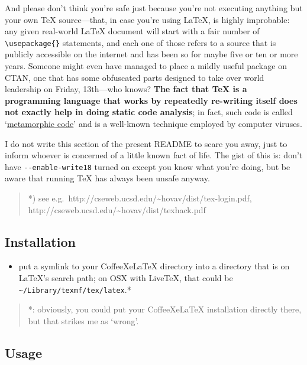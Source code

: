And please don't think you're safe just because you're not executing
anything but your own TeX source---that, in case you're using LaTeX, is
highly improbable: any given real-world LaTeX document will start with a
fair number of \texttt{\textbackslash{}usepackage\{\}} statements, and
each one of those refers to a source that is publicly accessible on the
internet and has been so for maybe five or ten or more years. Someone
might even have managed to place a mildly useful package on CTAN, one
that has some obfuscated parts designed to take over world leadership on
Friday, 13th---who knows? \textbf{The fact that TeX is a programming
language that works by repeatedly re-writing itself does not exactly
help in doing static code analysis}; in fact, such code is called
`\href{http://en.wikipedia.org/wiki/Metamorphic_code}{metamorphic code}'
and is a well-known technique employed by computer viruses.

I do not write this section of the present README to scare you away,
just to inform whoever is concerned of a little known fact of life. The
gist of this is: don't have \texttt{-{}-enable-write18} turned on except
you know what you're doing, but be aware that running TeX has always
been unsafe anyway.

\begin{quote}
*) see
e.g.~http://cseweb.ucsd.edu/\textasciitilde{}hovav/dist/tex-login.pdf,
http://cseweb.ucsd.edu/\textasciitilde{}hovav/dist/texhack.pdf
\end{quote}

\subsection{Installation}\label{installation}

\begin{itemize}
\itemsep1pt\parskip0pt
\item
  put a symlink to your CoffeeXeLaTeX directory into a directory that is
  on LaTeX's search path; on OSX with LiveTeX, that could be
  \texttt{\textasciitilde{}/Library/texmf/tex/latex}.*
\end{itemize}

\begin{quote}
*: obviously, you could put your CoffeeXeLaTeX installation directly
there, but that strikes me as `wrong'.
\end{quote}

\subsection{Usage}\label{usage}

